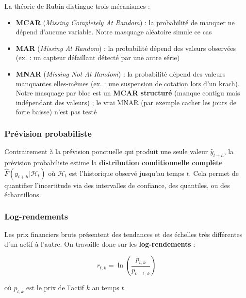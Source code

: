 \documentclass[12pt,a4paper]{article}
\newcounter{defctr}[section]
\renewcommand{\thedefctr}{\thesection.\arabic{defctr}}
\newenvironment{definition}[1][]
  {\refstepcounter{defctr}\begin{tcolorbox}[defstyle,title={D\'efinition~\thedefctr\if\relax\detokenize{#1}\relax\else~--- #1\fi}]}
  {\end{tcolorbox}}
\begin{document}
La th\'eorie de Rubin \cite{rubin1976} distingue trois m\'ecanismes :
\begin{itemize}
    \item \textbf{MCAR} (\textit{Missing Completely At Random}) : la probabilit\'e de manquer ne d\'epend d'aucune variable. Notre masquage al\'eatoire simule ce cas
    \item \textbf{MAR} (\textit{Missing At Random}) : la probabilit\'e d\'epend des valeurs observ\'ees (ex. : un capteur d\'efaillant d\'etect\'e par une autre s\'erie)
    \item \textbf{MNAR} (\textit{Missing Not At Random}) : la probabilit\'e d\'epend des valeurs manquantes elles-m\^emes (ex. : une suspension de cotation lors d'un krach). Notre masquage par bloc est un \textbf{MCAR structur\'e} (manque contigu mais ind\'ependant des valeurs) ; le vrai MNAR (par exemple cacher les jours de forte baisse) n'est pas test\'e
\end{itemize}

\subsubsection{Pr\'evision probabiliste}

\begin{definition}[Pr\'evision probabiliste]
Contrairement \`a la pr\'evision ponctuelle qui produit une seule valeur $\hat{y}_{t+h}$, la pr\'evision probabiliste estime la \textbf{distribution conditionnelle compl\`ete} $\hat{F}(y_{t+h} | \mathcal{H}_t)$ o\`u $\mathcal{H}_t$ est l'historique observ\'e jusqu'au temps $t$. Cela permet de quantifier l'incertitude via des intervalles de confiance, des quantiles, ou des \'echantillons.
\end{definition}

\subsubsection{Log-rendements}

Les prix financiers bruts pr\'esentent des tendances et des \'echelles tr\`es diff\'erentes d'un actif \`a l'autre. On travaille donc sur les \textbf{log-rendements} :

\begin{equation}
\boxed{r_{t,k} = \ln\left(\frac{p_{t,k}}{p_{t-1,k}}\right)}
\label{eq:log_return}
\end{equation}

o\`u $p_{t,k}$ est le prix de l'actif $k$ au temps $t$.
\end{document}
